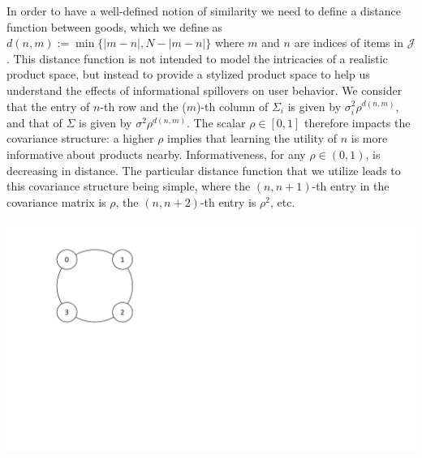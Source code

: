 \documentclass[sigconf]{acmart}
\begin{document}
In order to have a well-defined notion of similarity we need to define a distance function between goods, which we define as $d(n,m):=\min\{ \lvert m - n \rvert ,N - \lvert m - n \rvert \}$ where $m$ and $n$ are indices of items in $\mathcal{J}$. This distance function is not intended to model the intricacies of a realistic product space, but instead to provide a stylized product space to help us understand the effects of informational spillovers on user behavior. We consider that the entry of $n$-th row and the ($m$)-th column of $\Sigma_i$ is given by $\sigma_i^2 \rho^{d(n,m)}$, and that of $\Sigma$ is given by $\sigma^2 \rho^{d(n,m)}$. The scalar $\rho \in [0,1]$ therefore impacts the covariance structure: a higher $\rho$ implies that learning the utility of $n$ is more informative about products nearby. Informativeness, for any $\rho \in (0,1)$, is decreasing in distance. The particular distance function that we utilize leads to this covariance structure being simple, where the $(n,n+1)$-th entry in the covariance matrix is $\rho$, the $(n,n+2)$-th entry is $\rho^2$, etc.
\par
\begin{center}
\includegraphics[width=.4\linewidth]{Example-Bubbles.pdf}
\label{fig:illustrative_example}
\end{center}
\end{document}
